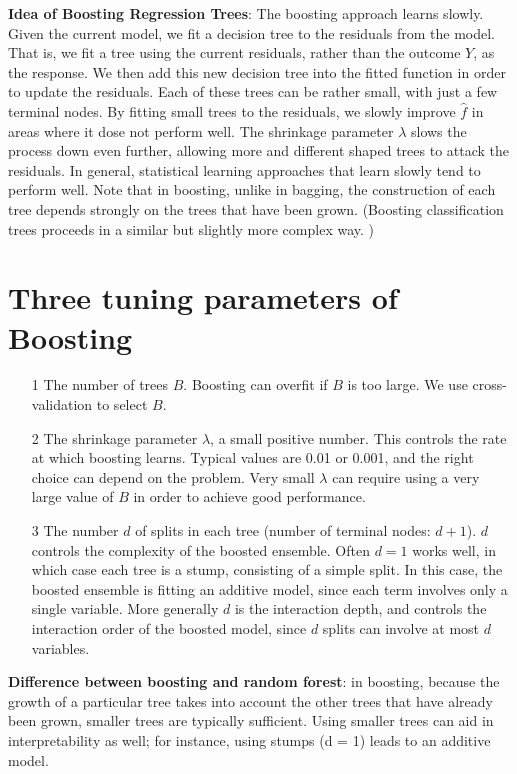 \documentclass[twoside,12pt]{article}
\begin{document}
\textbf{Idea of Boosting Regression Trees}: The boosting approach learns slowly. Given the current model, we fit a decision tree to the residuals from the model. That is, we fit a tree using the current residuals, rather than the outcome $Y$, as the response. We then add this new decision tree into the fitted function in order to update the residuals. Each of these trees can be rather small, with just a few terminal nodes. By fitting small trees to the residuals, we slowly improve $\hat{f}$ in areas where it dose not perform well. The shrinkage parameter $\lambda$ slows the process down even further, allowing more and different shaped trees to attack the residuals. In general, statistical learning approaches that learn slowly tend to perform well. Note that in boosting, unlike in bagging, the construction of each tree depends strongly on the trees that have been grown. (Boosting classification trees proceeds in a similar but slightly more complex way. )
\section{Three tuning parameters of Boosting}
\begin{itemize}
\item[1] The number of trees $B$. Boosting can overfit if $B$ is too large. We use cross-validation to select $B$.
\item[2] The shrinkage parameter $\lambda$, a small positive number. This controls the rate at which boosting learns. Typical values are 0.01 or 0.001, and the right choice can depend on the problem. Very small $\lambda$ can require using a very large value of $B$ in order to achieve good performance. 
\item[3] The number $d$ of splits in each tree (number of terminal nodes: $d + 1$). $d$ controls the complexity of the boosted ensemble. Often $d=1$ works well, in which case each tree is a stump, consisting of a simple split. In this case, the boosted ensemble is fitting an additive model, since each term involves only a single variable. More generally $d$ is the interaction depth, and controls the interaction order of the boosted model, since $d$ splits can involve at most $d$ variables. 
\end{itemize}
\textbf{Difference between boosting and random forest}: in boosting, because the growth of a particular tree takes into account the other trees that have already been grown, smaller trees are typically sufficient. Using smaller trees can aid in interpretability as well; for instance, using stumps (d = 1) leads to an additive model.
\end{document}
